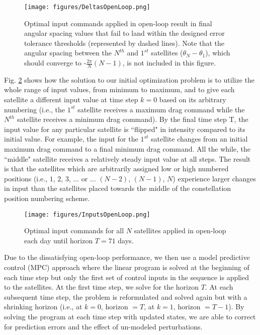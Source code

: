 \documentclass[letterpaper, 10 pt, conference]{ieeeconf}  %
\begin{document}
\begin{figure}[h]
\centering
\texttt{[image: figures/DeltasOpenLoop.png]}
\caption{Optimal input commands applied in open-loop result in final angular spacing values \iffalse($\theta_1 - \theta_2$, $\ldots$, $\theta_{N-1} - \theta_N$) \fi that fail to land within the designed error tolerance thresholds (represented by dashed lines). Note that the angular spacing between the $N^{th}$ and $1^{st}$ satellites ($\theta_N - \theta_1$), which should converge to -$\frac{2\pi}{N}(N-1)$, is not included in this figure.}
\label{fig:DeltasOpenLoop}
\end{figure}

Fig. \ref{fig:InputsOpenLoop} shows how the solution to our initial optimization problem is to utilize the whole range of input values, from minimum to maximum, and to give each satellite a different input value  at time step $k=0$ based on its arbitrary numbering (i.e., the $1^{st}$ satellite receives a maximum drag command while the $N^{th}$ satellite receives a minimum drag command). By the final time step T, the input value for any particular satellite is  ``flipped" in intensity compared to its initial value. For example, the input for the $1^{st}$ satellite changes from an initial maximum drag command to a final minimum drag command. All the while, the ``middle" satellite receives a relatively steady input value at all steps. The result is that the satellites which are arbitrarily assigned low or high numbered positions (i.e., $1$, $2$, $3$, ... or  ... $(N-2)$, $(N-1)$, $N$) experience larger changes in input than the satellites placed towards the middle of the constellation position numbering scheme.
\begin{figure}[h]
\centering
\texttt{[image: figures/InputsOpenLoop.png]}
\caption{Optimal input commands for all $N$ satellites applied in open-loop each day until horizon $T = 71$ days.}
\label{fig:InputsOpenLoop}
\end{figure}

Due to the dissatisfying open-loop performance, we then use a model predictive control (MPC) approach where the linear program is solved at the beginning of each time step but only the first set of control inputs in the sequence is applied to the satellites. At the first time step, we solve for the horizon $T$. At each subsequent time step, the problem is reformulated and solved again but with a shrinking horizon (i.e., at $k = 0$, horizon $= T$, at $k = 1$, horizon $= T-1$). By solving the program at each time step with updated states, we are able to correct for prediction errors and the effect of un-modeled perturbations.
\end{document}
